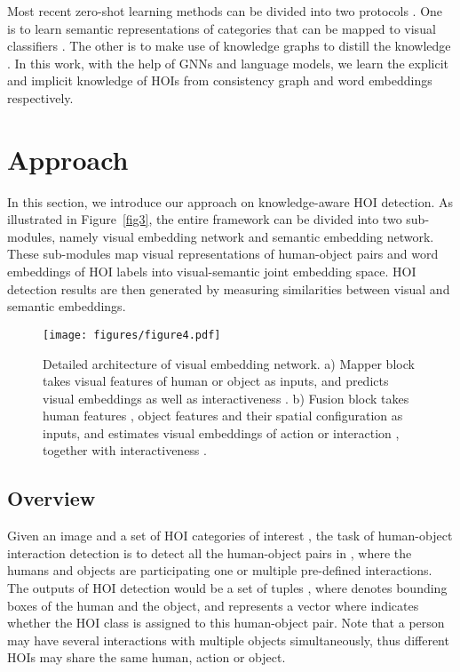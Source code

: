 \documentclass[sigconf,screen]{acmart}
\begin{document}
Most recent zero-shot learning methods can be divided into two protocols \cite{wang2019survey}. One is to learn semantic representations of categories that can be mapped to visual classifiers \cite{changpinyo2016synthesized,changpinyo2017predicting}. The other is to make use of knowledge graphs to distill the knowledge \cite{chen2013neil,deng2014large}. In this work, with the help of GNNs and language models, we learn the explicit and implicit knowledge of HOIs from consistency graph and word embeddings respectively. 

\section{Approach}

In this section, we introduce our approach on knowledge-aware HOI detection. As illustrated in Figure~\ref{fig3}, the entire framework can be divided into two sub-modules, namely visual embedding network and semantic embedding network. These sub-modules map visual representations of human-object pairs and word embeddings of HOI labels into visual-semantic joint embedding space. HOI detection results are then generated by measuring similarities between visual and semantic embeddings.

\begin{figure}
\centering
\texttt{[image: figures/figure4.pdf]}
\caption{Detailed architecture of visual embedding network. a) Mapper block takes visual features of human or object  as inputs, and predicts visual embeddings  as well as interactiveness . b) Fusion block takes human features , object features  and their spatial configuration  as inputs, and estimates visual embeddings of action or interaction , together with interactiveness .}
\label{fig4}
\end{figure}

\subsection{Overview}

Given an image  and a set of HOI categories of interest , the task of human-object interaction detection is to detect all the human-object pairs in , where the humans and objects are participating one or multiple pre-defined interactions. The outputs of HOI detection would be a set of tuples , where  denotes bounding boxes of the human and the object, and  represents a vector where  indicates whether the HOI class  is assigned to this human-object pair. Note that a person may have several interactions with multiple objects simultaneously, thus different HOIs may share the same human, action or object.
\end{document}
